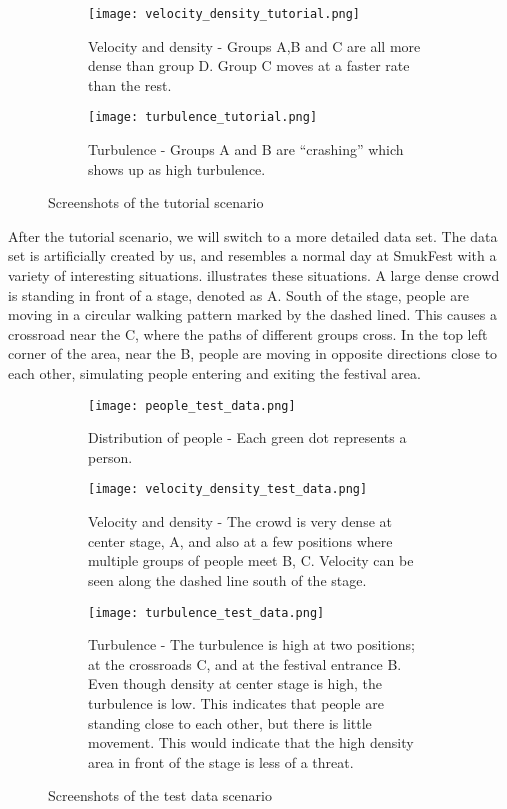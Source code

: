 \begin{figure}[htbp]
\begin{subfigure}[t]{.49\linewidth}
    \centering
    \texttt{[image: velocity\_density\_tutorial.png]}
    \caption{Velocity and density - Groups A,B and C are all more dense than group D. Group C moves at a faster rate than the rest.}
\end{subfigure}
\enspace
\begin{subfigure}[t]{.49\linewidth}
    \centering
    \texttt{[image: turbulence\_tutorial.png]}
    \caption{Turbulence - Groups A and B are \enquote{crashing} which shows up as high turbulence.}
\end{subfigure}
\caption{Screenshots of the tutorial scenario}
\label{fig:tutorial_screens}
\end{figure}

After the tutorial scenario, we will switch to a more detailed data set. The data set is artificially created by us, and resembles a normal day at SmukFest with a variety of interesting situations.  illustrates these situations. A large dense crowd is standing in front of a stage, denoted as A. South of the stage, people are moving in a circular walking pattern marked by the dashed lined. This causes a crossroad near the C, where the paths of different groups cross. In the top left corner of the area, near the B, people are moving in opposite directions close to each other, simulating people entering and exiting the festival area.

\begin{figure}[htbp]
\begin{subfigure}[t]{.49\linewidth}
    \centering
    \texttt{[image: people\_test\_data.png]}
    \caption{Distribution of people - Each green dot represents a person.}
\end{subfigure}
\enspace
\begin{subfigure}[t]{.49\linewidth}
    \centering
    \texttt{[image: velocity\_density\_test\_data.png]}
    \caption{Velocity and density - The crowd is very dense at center stage, A, and also at a few positions where multiple groups of people meet B, C. Velocity can be seen along the dashed line south of the stage.}
\end{subfigure}
\enspace
\begin{subfigure}[t]{.49\linewidth}
    \centering
    \texttt{[image: turbulence\_test\_data.png]}
    \caption{Turbulence - The turbulence is high at two positions; at the crossroads C, and at the festival entrance B. Even though density at center stage is high, the turbulence is low. This indicates that people are standing close to each other, but there is little movement. This would indicate that the high density area in front of the stage is less of a threat.}
\end{subfigure}
\caption{Screenshots of the test data scenario}
\label{fig:test_data_screens}
\end{figure}


